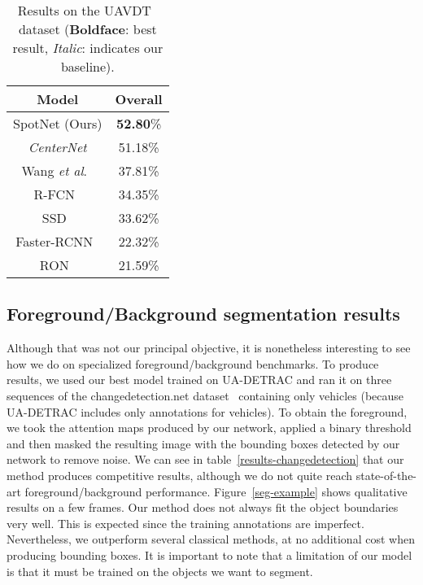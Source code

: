 \documentclass[10pt, conference, compsocconf]{IEEEtran}
\newcommand{\etal}{\textit{et al}.}
\begin{document}
\begin{table}[ht]
\footnotesize
\setlength\tabcolsep{3pt}
\def\arraystretch{1.5}
\centering
\caption{Results on the UAVDT~\cite{du2018unmanned} dataset (\textbf{Boldface}: best result, \textit{Italic}: indicates our baseline).}
\label{results-UAVDT}
\begin{tabular}{c|c}
Model & Overall \\
\hline
\hline
SpotNet (Ours)& \textbf{52.80}\%\\
\hline
\textit{CenterNet}\cite{duan2019centernet}& 51.18\%\\
\hline
Wang \etal ~\cite{wang2019learning} & 37.81\%\\
\hline
R-FCN~\cite{RFCN_NIPS2016_6465} &34.35\%\\
\hline
SSD~\cite{liu2016ssd} & 33.62\%\\
\hline
Faster-RCNN~\cite{ren2015faster} & 22.32\%\\
\hline
RON~\cite{kong2017ron} & 21.59\%\\
\end{tabular}
\vspace{-4mm}
\end{table}

\subsection{Foreground/Background segmentation results}

Although that was not our principal objective, it is nonetheless interesting to see how we do on specialized foreground/background benchmarks. To produce results, we used our best model trained on UA-DETRAC and ran it on three sequences of the changedetection.net dataset~\cite{goyette2012changedetection} containing only vehicles (because UA-DETRAC includes only annotations for vehicles). To obtain the foreground, we took the attention maps produced by our network, applied a binary threshold and then masked the resulting image with the bounding boxes detected by our network to remove noise. We can see in table~\ref{results-changedetection} that our method produces competitive results, although we do not quite reach state-of-the-art foreground/background performance. Figure~\ref{seg-example} shows qualitative results on a few frames. Our method does not always fit the object boundaries very well. This is expected since the training annotations are imperfect. Nevertheless, we outperform several classical methods, at no additional cost when producing bounding boxes. It is important to note that a limitation of our model is that it must be trained on the objects we want to segment.  
\end{document}
